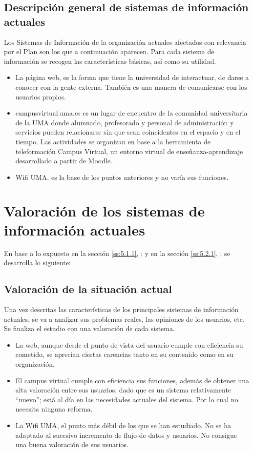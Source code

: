 \documentclass[11pt,a4paper,spanish,twoside]{report}
\begin{document}
\subsection{Descripción general de sistemas de información actuales} 
\label{ss:5.2.1}
Los Sistemas de Información de la organización actuales afectados con 
relevancia por el Plan son los que a continuación aparecen. Para cada sistema 
de información se recogen las características básicas, así como su utilidad.
\begin{itemize}
\item La página web, es la forma que tiene la universidad de interactuar,
  de darse a conocer con la gente externa. También es una manera de
  comunicarse con los usuarios propios.
\item campusvirtual.uma.es es un lugar de encuentro de la comunidad
  universitaria de la UMA donde alumnado, profesorado y personal de
  administración y servicios pueden relacionarse sin que sean coincidentes en
  el espacio y en el tiempo. Las actividades se organizan en base a la
  herramienta de teleformación Campus Virtual, un entorno virtual de
  enseñanza-aprendizaje desarrollado a partir de Moodle. 
\item Wifi UMA, es la base de los puntos anteriores y no varía sus funciones.
\end{itemize}

\section{Valoración de los sistemas de información actuales}
En base a lo expuesto 
en la sección \vref{ss:5.1.1}, \emph{}; y
en la sección \vref{ss:5.2.1}, \emph{}; 
se desarrolla lo siguiente:

\subsection{Valoración de la situación actual} \label{ss:5.3.1}
Una vez descritas las características de los principales sistemas de 
información actuales, se va a analizar sus problemas reales, las opiniones de 
los usuarios, etc. Se finaliza el estudio con una valoración de cada sistema.

\begin{itemize}
  \item La web, aunque desde el punto de vista del usuario cumple con
    eficiencia su cometido, se aprecian ciertas carencias tanto en su
    contenido como en su organización. 
  \item El campus virtual cumple con eficiencia sus funciones, además de
    obtener una alta valoración entre sus usuarios, dado que es un sistema
    relativamente ``nuevo''; está al día en las necesidades actuales del
    sistema. Por lo cual no necesita ninguna reforma. 
  \item La Wifi UMA, el punto más débil de los que se han estudiado. No se ha
    adaptado al sucesivo incremento de flujo de datos y usuarios. No
    consigue una buena valoración de sus usuarios.  
\end{itemize}
\end{document}
